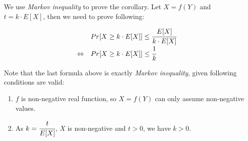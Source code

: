We use \textit{Markov inequality} to prove the corollary. Let $X = f(Y)$ and $t = k \cdot E[X]$, then we need to prove following:

\[
\def\arraystretch{1.5}
\begin{array}{l l}
                & Pr[X \geq k \cdot E[X]] \leq \cfrac{E[X]}{k \cdot E[X]} \\
\Leftrightarrow & Pr[X \geq k \cdot E[X]] \leq \cfrac{1}{k}
\end{array}
\]

\noindent
Note that the last formula above is exactly \textit{Markov inequality}, given following conditions are valid:

\begin{enumerate}

\item $f$ is non-negative real function, so $X = f(Y)$ can only assume non-negative values.

\item As $k = \cfrac{t}{E[X]}$, $X$ is non-negative and $t > 0$, we have $k > 0$.

\end{enumerate}